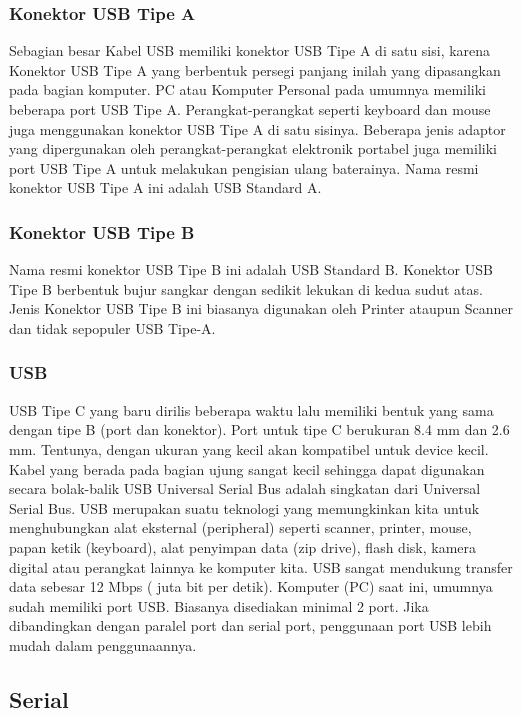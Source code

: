 \begin{itemize}
\subsubsection{Konektor USB Tipe A}
Sebagian besar Kabel USB memiliki konektor USB Tipe A di satu sisi, karena Konektor USB Tipe A yang berbentuk persegi panjang inilah yang dipasangkan pada bagian komputer. PC atau Komputer Personal pada umumnya memiliki beberapa port USB Tipe A. Perangkat-perangkat seperti keyboard dan mouse juga menggunakan konektor USB Tipe A di satu sisinya. Beberapa jenis adaptor yang dipergunakan oleh perangkat-perangkat elektronik portabel juga memiliki port USB Tipe A untuk melakukan pengisian ulang baterainya. Nama resmi konektor USB Tipe A ini adalah USB Standard A.

\subsubsection{Konektor USB Tipe B}
Nama resmi konektor USB Tipe B ini adalah USB Standard B. Konektor USB Tipe B berbentuk bujur sangkar dengan sedikit lekukan di kedua sudut atas. Jenis Konektor USB Tipe B ini biasanya digunakan oleh Printer ataupun Scanner dan tidak sepopuler USB Tipe-A.

\subsubsection{USB}
USB Tipe C yang baru dirilis beberapa waktu lalu memiliki bentuk yang sama dengan tipe B (port dan konektor). Port untuk tipe C berukuran 8.4 mm dan 2.6 mm. Tentunya, dengan ukuran yang kecil akan kompatibel untuk device kecil. Kabel yang berada pada bagian ujung sangat kecil sehingga dapat digunakan secara bolak-balik
USB Universal Serial Bus adalah singkatan dari Universal Serial Bus. USB merupakan suatu teknologi yang memungkinkan kita untuk menghubungkan alat eksternal (peripheral) seperti scanner, printer, mouse, papan ketik (keyboard), alat penyimpan data (zip drive), flash disk, kamera digital atau perangkat lainnya ke komputer kita. USB sangat mendukung transfer data sebesar 12 Mbps ( juta bit per detik). Komputer (PC) saat ini, umumnya sudah memiliki port USB. Biasanya disediakan minimal 2 port. Jika dibandingkan dengan paralel port dan serial port, penggunaan port USB lebih mudah dalam penggunaannya.

\subsection{Serial}

\end{itemize}

